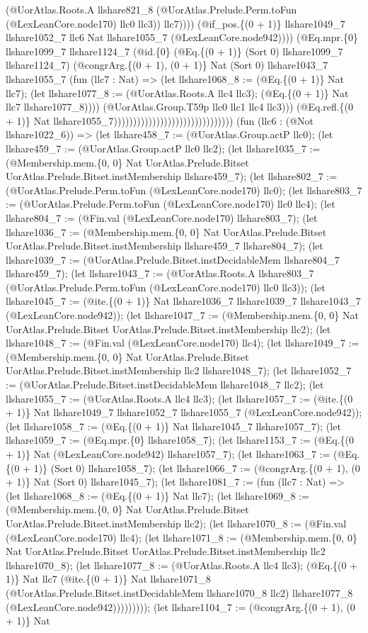 \documentclass[11pt]{article}
\begin{document}
(@UorAtlas.Roots.A llshare821\_8 (@UorAtlas.Prelude.Perm.toFun (@LexLeanCore.node170) llc0 llc3)) llc7)))) (@if\_pos.\{(0 + 1)\} llshare1049\_7 llshare1052\_7 llc6 Nat llshare1055\_7 (@LexLeanCore.node942)))) (@Eq.mpr.\{0\} llshare1099\_7 llshare1124\_7 (@id.\{0\} (@Eq.\{(0 + 1)\} (Sort 0) llshare1099\_7 llshare1124\_7) (@congrArg.\{(0 + 1), (0 + 1)\} Nat (Sort 0) llshare1043\_7 llshare1055\_7 (fun (llc7 : Nat) => (let llshare1068\_8 := (@Eq.\{(0 + 1)\} Nat llc7); (let llshare1077\_8 := (@UorAtlas.Roots.A llc4 llc3); (@Eq.\{(0 + 1)\} Nat llc7 llshare1077\_8)))) (@UorAtlas.Group.T59p llc0 llc1 llc4 llc3))) (@Eq.refl.\{(0 + 1)\} Nat llshare1055\_7))))))))))))))))))))))))))))))) (fun (llc6 : (@Not llshare1022\_6)) => (let llshare458\_7 := (@UorAtlas.Group.actP llc0); (let llshare459\_7 := (@UorAtlas.Group.actP llc0 llc2); (let llshare1035\_7 := (@Membership.mem.\{0, 0\} Nat UorAtlas.Prelude.Bitset UorAtlas.Prelude.Bitset.instMembership llshare459\_7); (let llshare802\_7 := (@UorAtlas.Prelude.Perm.toFun (@LexLeanCore.node170) llc0); (let llshare803\_7 := (@UorAtlas.Prelude.Perm.toFun (@LexLeanCore.node170) llc0 llc4); (let llshare804\_7 := (@Fin.val (@LexLeanCore.node170) llshare803\_7); (let llshare1036\_7 := (@Membership.mem.\{0, 0\} Nat UorAtlas.Prelude.Bitset UorAtlas.Prelude.Bitset.instMembership llshare459\_7 llshare804\_7); (let llshare1039\_7 := (@UorAtlas.Prelude.Bitset.instDecidableMem llshare804\_7 llshare459\_7); (let llshare1043\_7 := (@UorAtlas.Roots.A llshare803\_7 (@UorAtlas.Prelude.Perm.toFun (@LexLeanCore.node170) llc0 llc3)); (let llshare1045\_7 := (@ite.\{(0 + 1)\} Nat llshare1036\_7 llshare1039\_7 llshare1043\_7 (@LexLeanCore.node942)); (let llshare1047\_7 := (@Membership.mem.\{0, 0\} Nat UorAtlas.Prelude.Bitset UorAtlas.Prelude.Bitset.instMembership llc2); (let llshare1048\_7 := (@Fin.val (@LexLeanCore.node170) llc4); (let llshare1049\_7 := (@Membership.mem.\{0, 0\} Nat UorAtlas.Prelude.Bitset UorAtlas.Prelude.Bitset.instMembership llc2 llshare1048\_7); (let llshare1052\_7 := (@UorAtlas.Prelude.Bitset.instDecidableMem llshare1048\_7 llc2); (let llshare1055\_7 := (@UorAtlas.Roots.A llc4 llc3); (let llshare1057\_7 := (@ite.\{(0 + 1)\} Nat llshare1049\_7 llshare1052\_7 llshare1055\_7 (@LexLeanCore.node942)); (let llshare1058\_7 := (@Eq.\{(0 + 1)\} Nat llshare1045\_7 llshare1057\_7); (let llshare1059\_7 := (@Eq.mpr.\{0\} llshare1058\_7); (let llshare1153\_7 := (@Eq.\{(0 + 1)\} Nat (@LexLeanCore.node942) llshare1057\_7); (let llshare1063\_7 := (@Eq.\{(0 + 1)\} (Sort 0) llshare1058\_7); (let llshare1066\_7 := (@congrArg.\{(0 + 1), (0 + 1)\} Nat (Sort 0) llshare1045\_7); (let llshare1081\_7 := (fun (llc7 : Nat) => (let llshare1068\_8 := (@Eq.\{(0 + 1)\} Nat llc7); (let llshare1069\_8 := (@Membership.mem.\{0, 0\} Nat UorAtlas.Prelude.Bitset UorAtlas.Prelude.Bitset.instMembership llc2); (let llshare1070\_8 := (@Fin.val (@LexLeanCore.node170) llc4); (let llshare1071\_8 := (@Membership.mem.\{0, 0\} Nat UorAtlas.Prelude.Bitset UorAtlas.Prelude.Bitset.instMembership llc2 llshare1070\_8); (let llshare1077\_8 := (@UorAtlas.Roots.A llc4 llc3); (@Eq.\{(0 + 1)\} Nat llc7 (@ite.\{(0 + 1)\} Nat llshare1071\_8 (@UorAtlas.Prelude.Bitset.instDecidableMem llshare1070\_8 llc2) llshare1077\_8 (@LexLeanCore.node942))))))))); (let llshare1104\_7 := (@congrArg.\{(0 + 1), (0 + 1)\} Nat 
\end{document}

